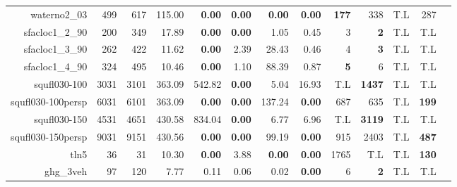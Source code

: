 \begin{landscape}
\begin{table*}[t]
\begin{tabular}{|r|r|r||r||r|r|r|r||r|r|r|r|r|}
                        waterno2\_03 &           499 &           617 &                            115.00 &  \textbf{0.00} &  \textbf{0.00} &  \textbf{0.00} &  \textbf{0.00} &       \textbf{177} &                338 &                T.L &                287 \\ 
                     sfacloc1\_2\_90 &           200 &           349 &                             17.89 &  \textbf{0.00} &  \textbf{0.00} &           1.05 &           0.45 &                  3 &         \textbf{2} &                T.L &                T.L \\ 
                     sfacloc1\_3\_90 &           262 &           422 &                             11.62 &  \textbf{0.00} &           2.39 &          28.43 &           0.46 &                  4 &         \textbf{3} &                T.L &                T.L \\ 
                     sfacloc1\_4\_90 &           324 &           495 &                             10.46 &  \textbf{0.00} &           1.10 &          88.39 &           0.87 &         \textbf{5} &                  6 &                T.L &                T.L \\ 
                        squfl030-100 &          3031 &          3101 &                            363.09 &         542.82 &  \textbf{0.00} &           5.04 &          16.93 &                T.L &      \textbf{1437} &                T.L &                T.L \\ 
                   squfl030-100persp &          6031 &          6101 &                            363.09 &  \textbf{0.00} &  \textbf{0.00} &         137.24 &  \textbf{0.00} &                687 &                635 &                T.L &       \textbf{199} \\ 
                        squfl030-150 &          4531 &          4651 &                            430.58 &         834.04 &  \textbf{0.00} &           6.77 &           6.96 &                T.L &      \textbf{3119} &                T.L &                T.L \\ 
                   squfl030-150persp &          9031 &          9151 &                            430.56 &  \textbf{0.00} &  \textbf{0.00} &          99.19 &  \textbf{0.00} &                915 &               2403 &                T.L &       \textbf{487} \\ 
                                tln5 &            36 &            31 &                             10.30 &  \textbf{0.00} &           3.88 &  \textbf{0.00} &  \textbf{0.00} &               1765 &                T.L &                T.L &       \textbf{130} \\ 
                           ghg\_3veh &            97 &           120 &                              7.77 &           0.11 &           0.06 &           0.02 &  \textbf{0.00} &                  6 &         \textbf{2} &                T.L &                T.L \\ 
\hline 
\end{tabular}\\ 
\end{table*} 
\end{landscape} 
